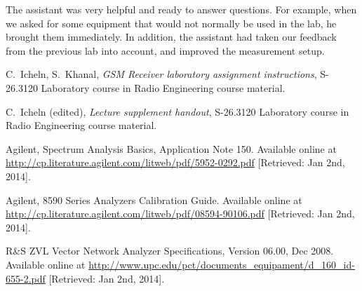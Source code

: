 \documentclass[a4paper, 12pt]{article}
\begin{document}
The assistant was very helpful and ready to answer questions. For example, when we asked for 
some equipment that would not normally be used in the lab, he brought them immediately. In 
addition, the assistant had taken our feedback from the previous lab into account, and improved 
the measurement setup.

\newpage
\begin{thebibliography}{9}%

 C.\ Icheln, S.\ Khanal, 
	\textit{GSM Receiver laboratory assignment instructions},
	S-26.3120 Laboratory course in Radio Engineering course material.
	
 C.\ Icheln (edited), 
	\textit{Lecture supplement handout},
	S-26.3120 Laboratory course in Radio Engineering course material.

 Agilent, Spectrum Analysis Basics, Application Note 150. 
	Available online at \url{http://cp.literature.agilent.com/litweb/pdf/5952-0292.pdf} 
	[Retrieved: Jan 2nd, 2014].
	
 Agilent, 8590 Series Analyzers Calibration Guide.
	Available online at \url{http://cp.literature.agilent.com/litweb/pdf/08594-90106.pdf}
	[Retrieved: Jan 2nd, 2014].
	
 R\&S ZVL Vector Network Analyzer Specifications, 
	Version 06.00, Dec 2008. 
	Available online at \url{http://www.upc.edu/pct/documents_equipament/d_160_id-655-2.pdf} 
	[Retrieved: Jan 2nd, 2014].


	

	

\end{thebibliography}
\end{document}

